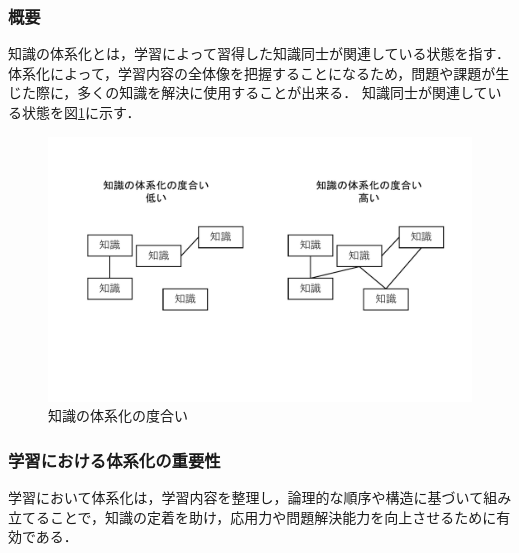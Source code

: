 \documentclass[12pt,a4j,titlepage]{ltjsarticle}
\begin{document}
\subsubsection{概要}
知識の体系化とは，学習によって習得した知識同士が関連している状態を指す．
体系化によって，学習内容の全体像を把握することになるため，問題や課題が生じた際に，多くの知識を解決に使用することが出来る．
知識同士が関連している状態を図\ref{fig:tisiki_doai}に示す．

\begin{figure}[!htb]
  \centering
  \includegraphics[width=15cm]{tisiki_doai.pdf}
  \caption{知識の体系化の度合い}
  \label{fig:tisiki_doai}
\end{figure}


\subsubsection{学習における体系化の重要性}
学習において体系化は，学習内容を整理し，論理的な順序や構造に基づいて組み立てることで，知識の定着を助け，応用力や問題解決能力を向上させるために有効である．




\end{document}
